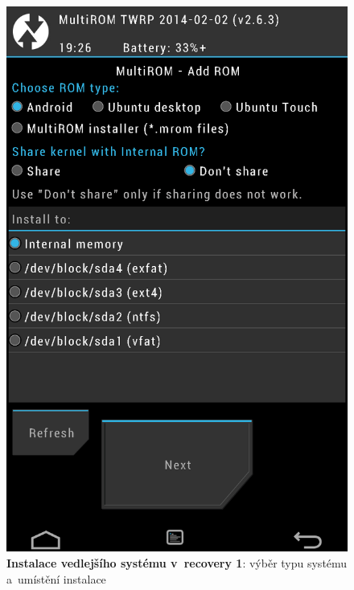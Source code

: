 \documentclass[12pt, a4paper, oneside]{article}
\newcommand{\B}{\textbf} %
\begin{document}
\begin{figure}[H]
\begin{center}
 \includegraphics[height=\textheight-40]{img/recovery_install1.png}
\caption{\B{Instalace vedlejšího systému v~recovery 1}: výběr typu systému a~umístění instalace}
\end{center}
\end{figure}
\end{document}
